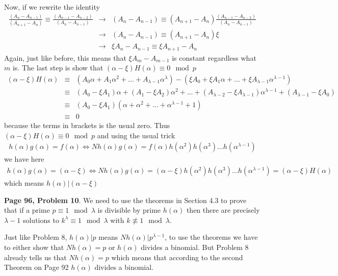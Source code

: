 \documentclass[aps,preprint,preprintnumbers,nofootinbib,showpacs,prd]{revtex4-1}
\newcommand{\nbea}{\begin{eqnarray*}}
\newcommand{\neea}{\end{eqnarray*}}
\begin{document}
Now, if we rewrite the identity
%
\nbea
\frac{(A_n - A_{n - 1})}{(A_{n + 1} - A_n)} \equiv \frac{(A_{n - 1} - A_{n - 2})}{(A_n - A_{n - 1})} & \to & (A_n - A_{n - 1}) \equiv (A_{n + 1} - A_n) \frac{(A_{n - 1} - A_{n - 2})}{(A_n - A_{n - 1})} \\
& \to & (A_n - A_{n - 1}) \equiv (A_{n + 1} - A_n) \xi \\
& \to & \xi A_n - A_{n - 1} \equiv \xi A_{n + 1} - A_n
\neea
%
Again, just like before, this means that $\xi A_{m} - A_{m - 1}$ is constant regardless what $m$ is. The last step is show that $(\alpha - \xi) H(\alpha) \equiv 0 \mod{p}$
%
\nbea
(\alpha - \xi) H(\alpha) & \equiv & (A_0 \alpha + A_1 \alpha^2 + \dots + A_{\lambda - 1}\alpha^\lambda) - (\xi A_0 + \xi A_1 \alpha + \dots + \xi A_{\lambda - 1} \alpha^{\lambda - 1}) \\
& \equiv & (A_0 - \xi A_1)\alpha + (A_1 - \xi A_2) \alpha^2 + \dots + (A_{\lambda - 2} - \xi A_{\lambda - 1}) \alpha^{\lambda - 1} + (A_{\lambda - 1} - \xi A_0) \\
& \equiv & (A_0 - \xi A_1) (\alpha + \alpha^2 + \dots + \alpha^{\lambda - 1} + 1) \\
& \equiv & 0
\neea
%
because the terms in brackets is the usual zero. Thus $(\alpha - \xi) H(\alpha) \equiv 0 \mod{p}$ and using the usual trick
%
\nbea
h(\alpha) g(\alpha) = f(\alpha) \Longleftrightarrow Nh(\alpha) g(\alpha) = f(\alpha) h(\alpha^2) h(\alpha^3) \dots h(\alpha^{\lambda - 1})
\neea
%
we have here
%
\nbea
h(\alpha) g(\alpha) = (\alpha - \xi) \Longleftrightarrow Nh(\alpha) g(\alpha) = (\alpha - \xi) h(\alpha^2) h(\alpha^3) \dots h(\alpha^{\lambda - 1}) = (\alpha - \xi) H(\alpha)
\neea
%
which means $h(\alpha)|(\alpha - \xi)$

{\bf Page 96, Problem 10}. We need to use the theorems in Section 4.3 to prove that if a prime $p \equiv 1 \mod{\lambda}$ is divisible by prime $h(\alpha)$ then there are precisely $\lambda - 1$ solutions to $k^\lambda \equiv 1\mod{\lambda}$ with $k\not\equiv1\mod{\lambda}$.

Just like Problem 8, $h(\alpha)|p$ means $Nh(\alpha)|p^{\lambda-1}$, to use the theorems we have to either show that $Nh(\alpha) = p$ or $h(\alpha)$ divides a binomial. But Problem 8 already tells us that $Nh(\alpha) = p$ which means that according to the second Theorem on Page 92 $h(\alpha)$ divides a binomial.
\end{document}

